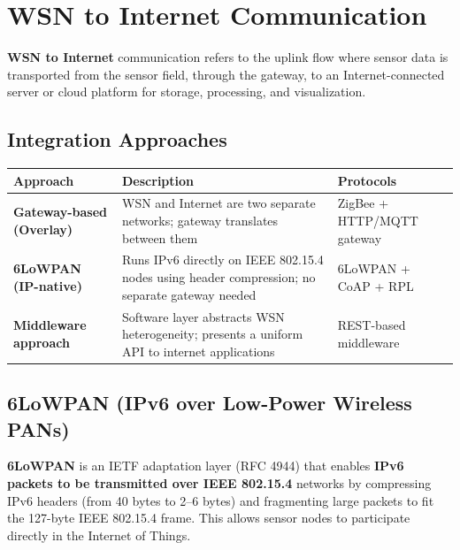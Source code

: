 \documentclass[12pt,a4paper]{article}
\renewcommand{\arraystretch}{1.45}
\begin{document}
\section{WSN to Internet Communication}

\begin{tcolorbox}[defbox, title={\textbf{WSN-to-Internet Communication}}]
\textbf{WSN to Internet} communication refers to the uplink flow where sensor data is transported from the sensor field, through the gateway, to an Internet-connected server or cloud platform for storage, processing, and visualization.
\end{tcolorbox}

\subsection{Integration Approaches}

\par\noindent
{\renewcommand{\arraystretch}{1.5}%
\begin{tabularx}{\linewidth}{|B{3.2cm}|Y|Y|}
\hline
\textbf{Approach} & \textbf{Description} & \textbf{Protocols} \\
\hline
\textbf{Gateway-based (Overlay)} & WSN and Internet are two separate networks; gateway translates between them & ZigBee + HTTP/MQTT gateway \\
\hline
\textbf{6LoWPAN (IP-native)} & Runs IPv6 directly on IEEE 802.15.4 nodes using header compression; no separate gateway needed & 6LoWPAN + CoAP + RPL \\
\hline
\textbf{Middleware approach} & Software layer abstracts WSN heterogeneity; presents a uniform API to internet applications & REST-based middleware \\
\hline
\end{tabularx}}

\subsection{6LoWPAN (IPv6 over Low-Power Wireless PANs)}

\begin{tcolorbox}[defbox, title={\textbf{6LoWPAN --- Definition}}]
\textbf{6LoWPAN} is an IETF adaptation layer (RFC 4944) that enables \textbf{IPv6 packets to be transmitted over IEEE 802.15.4} networks by compressing IPv6 headers (from 40 bytes to 2--6 bytes) and fragmenting large packets to fit the 127-byte IEEE 802.15.4 frame. This allows sensor nodes to participate directly in the Internet of Things.
\end{tcolorbox}
\end{document}
